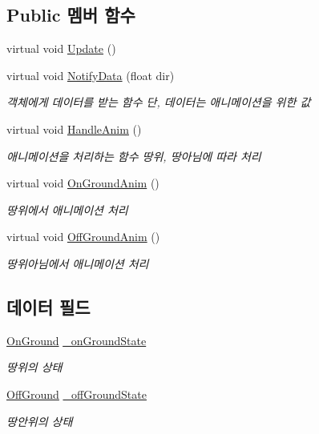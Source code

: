 \subsection*{Public 멤버 함수}
\begin{DoxyCompactItemize}
\item 
virtual void \mbox{\hyperlink{class_state_ad3ecac701a93b8ef7e5365e0fc599243}{Update}} ()
\item 
virtual void \mbox{\hyperlink{class_state_a7c2adea0228ec1582cd5bda7b36d245e}{Notify\+Data}} (float dir)
\begin{DoxyCompactList}\small\item\em 객체에게 데이터를 받는 함수 단, 데이터는 애니메이션을 위한 값 \end{DoxyCompactList}\item 
virtual void \mbox{\hyperlink{class_state_aa064ec6cd84d4a09b2c72a536125c74b}{Handle\+Anim}} ()
\begin{DoxyCompactList}\small\item\em 애니메이션을 처리하는 함수\textquotesingle{} 땅위, 땅아님에 따라 처리 \end{DoxyCompactList}\item 
virtual void \mbox{\hyperlink{class_state_adc5e7be4e977f0a64b29b01171eda8af}{On\+Ground\+Anim}} ()
\begin{DoxyCompactList}\small\item\em 땅위에서 애니메이션 처리 \end{DoxyCompactList}\item 
virtual void \mbox{\hyperlink{class_state_a2909a234430fa7752fadf2bb993ab5e2}{Off\+Ground\+Anim}} ()
\begin{DoxyCompactList}\small\item\em 땅위아님에서 애니메이션 처리 \end{DoxyCompactList}\end{DoxyCompactItemize}
\subsection*{데이터 필드}
\begin{DoxyCompactItemize}
\item 
\mbox{\hyperlink{class_state_ab9eb1c1d81f1903b8486d1275e78b68e}{On\+Ground}} \mbox{\hyperlink{class_state_ab3170df5e58f541f39edff3c1278d443}{\+\_\+on\+Ground\+State}}
\begin{DoxyCompactList}\small\item\em 땅위의 상태 \end{DoxyCompactList}\item 
\mbox{\hyperlink{class_state_a7d945e793324c017a973205564cf1a56}{Off\+Ground}} \mbox{\hyperlink{class_state_ad421039bfc35b46969f174c9617ab786}{\+\_\+off\+Ground\+State}}
\begin{DoxyCompactList}\small\item\em 땅안위의 상태 \end{DoxyCompactList}\end{DoxyCompactItemize}
